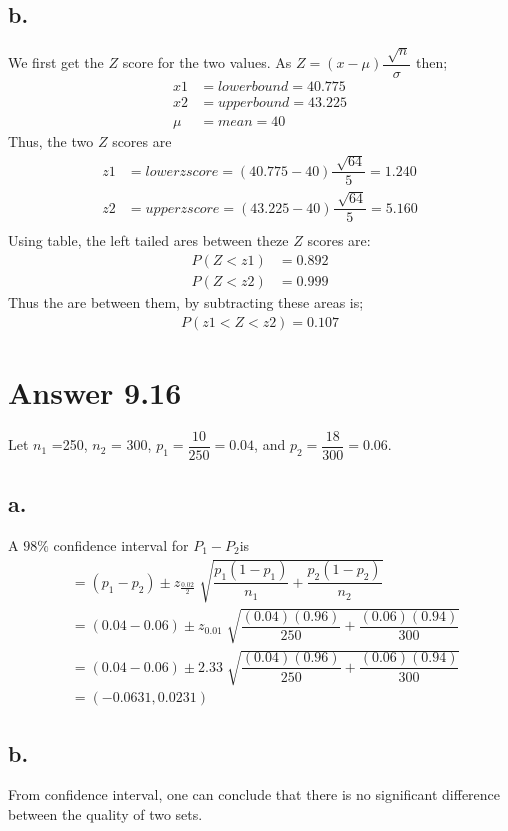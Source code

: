 \documentclass[12pt]{article}
\begin{document}
\subsection*{b.}
We first get the $Z$ score for the two values. As $Z = (x -  \mu)\dfrac{\sqrt[]{n}}{\sigma}$ then;
\begin{align*}
x1 &= lowerbound = 40.775\\
x2 &= upperbound = 43.225\\
\mu &= mean = 40
\end{align*}
Thus, the two $Z$ scores are
\begin{align*}
z1 &= lower z score = (40.775 - 40)\dfrac{\sqrt[]{64}}{5} = 1.240\\
z2 &= upper z score = (43.225 - 40)\dfrac{\sqrt[]{64}}{5} = 5.160\\
\end{align*}
Using table, the left tailed ares between theze $Z$ scores are:
\begin{align*}
P(Z < z1) &= 0.892 \\
P(Z < z2) &= 0.999
\end{align*}
Thus the are between them, by subtracting these areas is;
\begin{align*}
P(z1 < Z < z2) = 0.107
\end{align*}	

\section*{Answer 9.16}
Let $n_1$ =250, $n_2$ = 300, $p_1 = \dfrac{10}{250} = 0.04$, and $p_2 = \dfrac{18}{300} = 0.06$.

\subsection*{a.}
A $98\%$ confidence interval for $P_1 - P_2$is
\begin{align*}
&=(p_1 - p_2) \pm z_{\frac{0.02}{2}} \sqrt[]{\dfrac{p_1(1-p_1)}{n_1} + \dfrac{p_2(1-p_2)}{n_2}}\\
&=(0.04 - 0.06) \pm z_{0.01} \sqrt[]{\dfrac{(0.04)(0.96)}{250} + \dfrac{(0.06)(0.94)}{300}}\\
&=(0.04 - 0.06) \pm 2.33 \sqrt[]{\dfrac{(0.04)(0.96)}{250} + \dfrac{(0.06)(0.94)}{300}} \\
&=(-0.0631,0.0231)
\end{align*}

\subsection*{b.}
From confidence interval, one can conclude that there is no significant difference between the quality of two sets.
\end{document}
